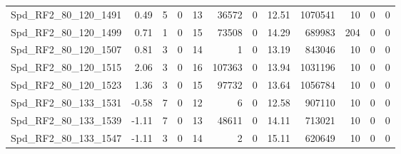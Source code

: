 \begin{longtable}[c]{@{}lrrrrrrrrrrr@{}}
Spd\_RF2\_80\_120\_1491       & 0.49                   & 5                       & 0                       & 13                     & 36572                   & 0                       & 12.51                   & 1070541                  & 10                       & 0                        & 0                        \\
Spd\_RF2\_80\_120\_1499       & 0.71                   & 1                       & 0                       & 15                     & 73508                   & 0                       & 14.29                   & 689983                   & 204                      & 0                        & 0                        \\
Spd\_RF2\_80\_120\_1507       & 0.81                   & 3                       & 0                       & 14                     & 1                       & 0                       & 13.19                   & 843046                   & 10                       & 0                        & 0                        \\
Spd\_RF2\_80\_120\_1515       & 2.06                   & 3                       & 0                       & 16                     & 107363                  & 0                       & 13.94                   & 1031196                  & 10                       & 0                        & 0                        \\
Spd\_RF2\_80\_120\_1523       & 1.36                   & 3                       & 0                       & 15                     & 97732                   & 0                       & 13.64                   & 1056784                  & 10                       & 0                        & 0                        \\
Spd\_RF2\_80\_133\_1531       & -0.58                  & 7                       & 0                       & 12                     & 6                       & 0                       & 12.58                   & 907110                   & 10                       & 0                        & 0                        \\
Spd\_RF2\_80\_133\_1539       & -1.11                  & 7                       & 0                       & 13                     & 48611                   & 0                       & 14.11                   & 713021                   & 10                       & 0                        & 0                        \\
Spd\_RF2\_80\_133\_1547       & -1.11                  & 3                       & 0                       & 14                     & 2                       & 0                       & 15.11                   & 620649                   & 10                       & 0                        & 0                        \\

\end{longtable}
